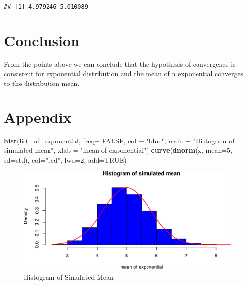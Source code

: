 \documentclass[]{article}
\newenvironment{Shaded}{\begin{snugshade}}{\end{snugshade}}
\newcommand{\KeywordTok}[1]{\textcolor[rgb]{0.13,0.29,0.53}{\textbf{{#1}}}}
\newcommand{\DataTypeTok}[1]{\textcolor[rgb]{0.13,0.29,0.53}{{#1}}}
\newcommand{\DecValTok}[1]{\textcolor[rgb]{0.00,0.00,0.81}{{#1}}}
\newcommand{\StringTok}[1]{\textcolor[rgb]{0.31,0.60,0.02}{{#1}}}
\newcommand{\OtherTok}[1]{\textcolor[rgb]{0.56,0.35,0.01}{{#1}}}
\newcommand{\NormalTok}[1]{{#1}}
\begin{document}
\begin{verbatim}
## [1] 4.979246 5.010089
\end{verbatim}

\section{Conclusion}\label{conclusion}

From the points above we can conclude that the hypothesis of convergence
is consistent for exponential distribution and the mean of n exponential
converges to the distribution mean.

\newpage

\section{Appendix}\label{appendix}

\begin{Shaded}
\begin{Highlighting}[]
    \KeywordTok{hist}\NormalTok{(list_of_exponential, }\DataTypeTok{freq=} \OtherTok{FALSE}\NormalTok{, }\DataTypeTok{col =} \StringTok{"blue"}\NormalTok{, }\DataTypeTok{main =} \StringTok{"Histogram of simulated mean"}\NormalTok{, }\DataTypeTok{xlab =} \StringTok{"mean of exponential"}\NormalTok{)}
    \KeywordTok{curve}\NormalTok{(}\KeywordTok{dnorm}\NormalTok{(x, }\DataTypeTok{mean=}\DecValTok{5}\NormalTok{, }\DataTypeTok{sd=}\NormalTok{std), }
          \DataTypeTok{col=}\StringTok{"red"}\NormalTok{, }\DataTypeTok{lwd=}\DecValTok{2}\NormalTok{, }\DataTypeTok{add=}\OtherTok{TRUE}\NormalTok{)}
\end{Highlighting}
\end{Shaded}

\begin{figure}[htbp]
\centering
\includegraphics{./TCL_Convergence_files/figure-latex/unnamed-chunk-6-1.pdf}
\caption{Histogram of Simulated Mean}
\end{figure}
\end{document}

